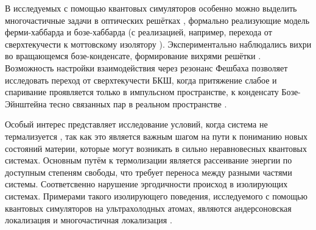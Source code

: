 В исследуемых с помощью квантовых симуляторов особенно можно выделить многочастичные задачи в оптических решётках \cite{bloch_many-body_2008}, формально реализующие модель ферми-хаббарда и бозе-хаббарда (с реализацией, например, перехода от сверхтекучести к моттовскому изолятору \cite{Greiner2002}). Экспериментально наблюдались вихри во вращающемся бозе-конденсате, формирование вихрями решётки \cite{Klaus_2022}.  Возможность настройки взаимодействия через резонанс Фешбаха позволяет исследовать переход от сверхтекучести БКШ, когда притяжение слабое и спаривание проявляется только в импульсном пространстве, к конденсату Бозе-Эйнштейна тесно связанных пар в реальном пространстве \cite{bloch_many-body_2008}.

Особый интерес представляет исследование условий, когда система не термализуется \cite{abanin_colloquium_2019}, так как это является важным шагом на пути к пониманию новых состояний материи, которые могут возникать в сильно неравновесных квантовых системах. Основным путём к термолизации является рассеивание энергии по доступным степеням свободы, что требует переноса между разными частями системы. Соответсвенно нарушение эргодичности происход в изолирующих системах. Примерами такого изолирующего поведения, исследуемого с помощью квантовых симуляторов на ультрахолодных атомах, являются андерсоновская локализация \cite{roati_anderson_2008} и многочастичная локализация \cite{choi_exploring_2016}.
